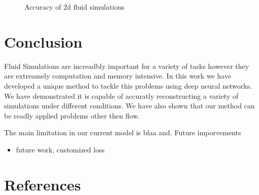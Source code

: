 \documentclass{article}
\begin{document}
\begin{figure}[!t]
\centering
{}
\caption{Accuracy of 2d fluid simulations }
\label{fig:bouncing_balls_error_3}
\end{figure}


\section{Conclusion}

Fluid Simulations are increadbly important for a variety of tasks however they are extreamely computation and memory intensive. In this work we have developed a unique method to tackle this problems using deep neural networks. We have demonstrated it is capable of accuratly reconstructing a variety of simulations under different conditions. We have also shown that our method can be readly applied problems other then flow.

The main limitation in our current model is blaa and. Future imporvements 

\begin{itemize}
  \item future work, customized loss
\end{itemize}

\section*{References}



\end{document}
